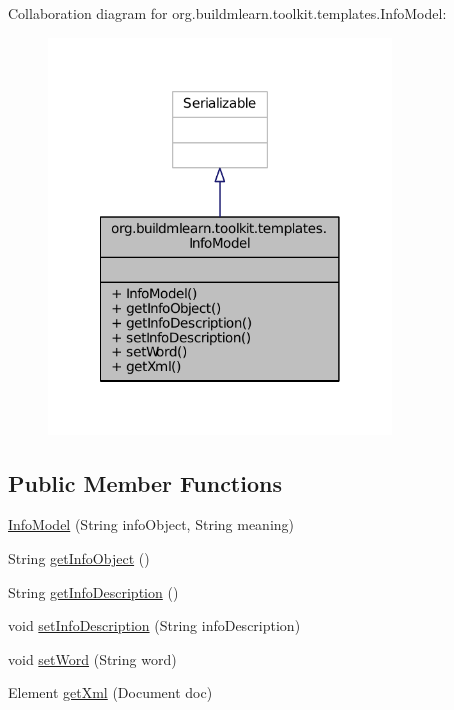 Collaboration diagram for org.\-buildmlearn.\-toolkit.\-templates.\-Info\-Model\-:
\nopagebreak
\begin{figure}[H]
\begin{center}
\leavevmode
\includegraphics[width=258pt]{dc/d37/classorg_1_1buildmlearn_1_1toolkit_1_1templates_1_1InfoModel__coll__graph}
\end{center}
\end{figure}
\subsection*{Public Member Functions}
\begin{DoxyCompactItemize}
\item 
\hyperlink{classorg_1_1buildmlearn_1_1toolkit_1_1templates_1_1InfoModel_a5ffb5146ce8fcf0e4504cd8870e26544}{Info\-Model} (String info\-Object, String meaning)
\item 
String \hyperlink{classorg_1_1buildmlearn_1_1toolkit_1_1templates_1_1InfoModel_a34b917e09a5b8a369d9a1b8fdb4e1043}{get\-Info\-Object} ()
\item 
String \hyperlink{classorg_1_1buildmlearn_1_1toolkit_1_1templates_1_1InfoModel_aaa53a79383392b5be51d202b76e65c5f}{get\-Info\-Description} ()
\item 
void \hyperlink{classorg_1_1buildmlearn_1_1toolkit_1_1templates_1_1InfoModel_a80956d6760064ebac06c98b0cd748825}{set\-Info\-Description} (String info\-Description)
\item 
void \hyperlink{classorg_1_1buildmlearn_1_1toolkit_1_1templates_1_1InfoModel_a207189ef74d5c4f2fc4a356d6135c14e}{set\-Word} (String word)
\item 
Element \hyperlink{classorg_1_1buildmlearn_1_1toolkit_1_1templates_1_1InfoModel_a603a8ab258eec5da500824267cbb86df}{get\-Xml} (Document doc)
\end{DoxyCompactItemize}


